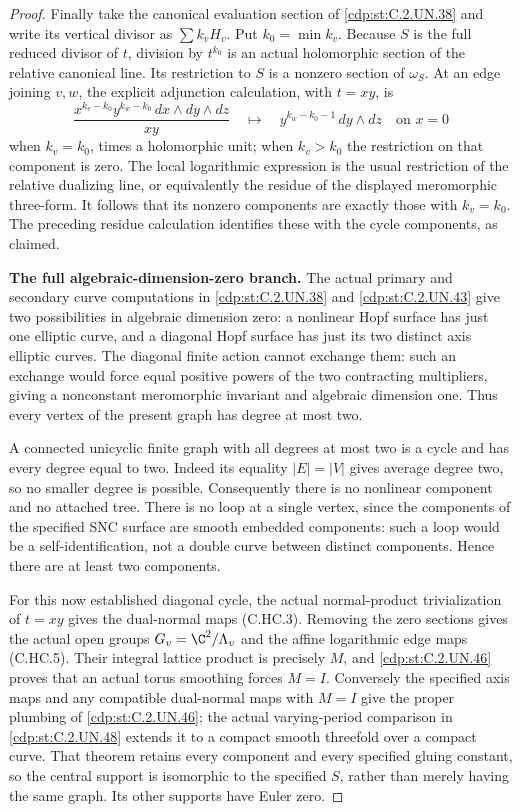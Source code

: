 \begin{proof}
Finally take the canonical evaluation section of \ref{cdp:st:C.2.UN.38} and
write its vertical divisor as $\sum k_vH_v$. Put $k_0=\min k_v$.
Because $S$ is the full reduced divisor of $t$, division by
$t^{k_0}$ is an actual holomorphic section of the relative
canonical line. Its restriction to $S$ is a nonzero section of
$\omega_S$. At an edge joining $v,w$, the explicit adjunction
calculation, with $t=xy$, is
\[
 \frac{x^{k_v-k_0}y^{k_w-k_0}\,dx\wedge dy\wedge dz}{xy}
 \quad\longmapsto\quad
 y^{k_w-k_0-1}\,dy\wedge dz\quad\text{on }x=0
                                                        \tag{C.HR.8}\label{cdp:eq:C.HR.8}
\]
when $k_v=k_0$, times a holomorphic unit; when $k_v>k_0$ the
restriction on that component is zero. The local logarithmic
expression is the usual restriction of the relative dualizing
line, or equivalently the residue of the displayed meromorphic
three-form. It follows that its nonzero components are exactly
those with $k_v=k_0$. The preceding residue calculation identifies
these with the cycle components, as claimed.

\par\medskip\noindent\textbf{The full algebraic-dimension-zero branch.}
The actual primary and secondary curve computations in
\ref{cdp:st:C.2.UN.38} and \ref{cdp:st:C.2.UN.43} give two possibilities in algebraic
dimension zero: a nonlinear Hopf surface has just one elliptic
curve, and a diagonal Hopf surface has just its two distinct
axis elliptic curves. The diagonal finite action cannot exchange
them: such an exchange would force equal positive powers of the
two contracting multipliers, giving a nonconstant meromorphic
invariant and algebraic dimension one. Thus every vertex of the
present graph has degree at most two.

A connected unicyclic finite graph with all degrees at most two
is a cycle and has every degree equal to two. Indeed its equality
$|E|=|V|$ gives average degree two, so no smaller degree is possible.
Consequently there is no nonlinear component and no attached
tree. There is no loop at a single vertex, since the components
of the specified SNC surface are smooth embedded components:
such a loop would be a self-identification, not a double curve
between distinct components. Hence there are at least two
components.

For this now established diagonal cycle, the actual normal-product
trivialization of $t=xy$ gives the dual-normal maps
(C.HC.3). Removing the zero sections gives the actual open groups
$G_v=\C^2/\Lambda_v$ and the affine logarithmic edge maps
(C.HC.5). Their integral lattice product is precisely $M$, and
\ref{cdp:st:C.2.UN.46} proves that an actual torus smoothing forces $M=I$.
Conversely the specified axis maps and any compatible dual-normal
maps with $M=I$ give the proper plumbing of \ref{cdp:st:C.2.UN.46}; the actual
varying-period comparison in \ref{cdp:st:C.2.UN.48} extends it to a compact
smooth threefold over a compact curve. That theorem retains every
component and every specified gluing constant, so the central
support is isomorphic to the specified $S$, rather than merely
having the same graph. Its other supports have Euler zero.


\end{proof}
